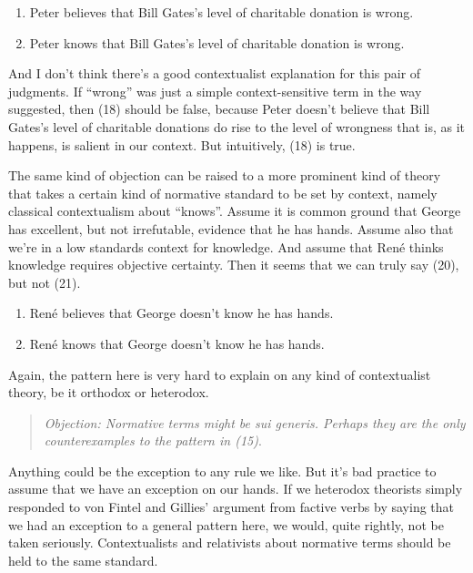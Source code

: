 \documentclass[
  11pt,
  letterpaper,
  DIV=11,
  numbers=noendperiod,
  twoside]{scrartcl}
\providecommand{\tightlist}{%
  \setlength{\itemsep}{0pt}\setlength{\parskip}{0pt}}
\begin{document}
\begin{enumerate}
\def\labelenumi{\arabic{enumi}.}
\setcounter{enumi}{17}
\tightlist
\item
  Peter believes that Bill Gates's level of charitable donation is
  wrong.
\item
  Peter knows that Bill Gates's level of charitable donation is wrong.
\end{enumerate}

And I don't think there's a good contextualist explanation for this pair
of judgments. If ``wrong'' was just a simple context-sensitive term in
the way suggested, then (18) should be false, because Peter doesn't
believe that Bill Gates's level of charitable donations do rise to the
level of wrongness that is, as it happens, is salient in our context.
But intuitively, (18) is true.

The same kind of objection can be raised to a more prominent kind of
theory that takes a certain kind of normative standard to be set by
context, namely classical contextualism about ``knows''. Assume it is
common ground that George has excellent, but not irrefutable, evidence
that he has hands. Assume also that we're in a low standards context for
knowledge. And assume that René thinks knowledge requires objective
certainty. Then it seems that we can truly say (20), but not (21).

\begin{enumerate}
\def\labelenumi{\arabic{enumi}.}
\setcounter{enumi}{19}
\tightlist
\item
  René believes that George doesn't know he has hands.
\item
  René knows that George doesn't know he has hands.
\end{enumerate}

Again, the pattern here is very hard to explain on any kind of
contextualist theory, be it orthodox or heterodox.

\begin{quote}
\emph{Objection: Normative terms might be sui generis. Perhaps they are
the only counterexamples to the pattern in (15)}.
\end{quote}

Anything could be the exception to any rule we like. But it's bad
practice to assume that we have an exception on our hands. If we
heterodox theorists simply responded to von Fintel and Gillies' argument
from factive verbs by saying that we had an exception to a general
pattern here, we would, quite rightly, not be taken seriously.
Contextualists and relativists about normative terms should be held to
the same standard.
\end{document}
